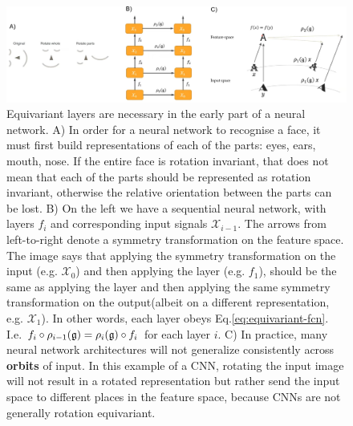 \documentclass[11pt]{article}
\numberwithin{equation}{section}
\begin{document}
\begin{figure}
\begin{center}
\includegraphics[width=\columnwidth]{../figures/invariance-equivariance.png}  
\end{center}
\caption{Equivariant layers are necessary in the early part of a neural network. A) In order for a neural network to recognise a face, it must first build representations of each of the parts: eyes, ears, mouth, nose. If the entire face is rotation invariant, that does not mean that each of the parts should be represented as rotation invariant, otherwise the relative orientation between the parts can be lost. B) On the left we have a sequential neural network, with layers $f_i$ and corresponding input signals $\mathcal{X}_{i-1}$. The arrows from left-to-right denote a symmetry transformation on the feature space. The image says that applying the symmetry transformation on the input (e.g. $\mathcal{X}_0$) and then applying the layer (e.g. $f_1$), should be the same as applying the layer and then applying the same symmetry transformation on the output(albeit on a different representation, e.g. $\mathcal{X}_1$). In other words, each layer obeys Eq.\eqref{eq:equivariant-fcn}. I.e. $f_i \circ \rho_{i-1}(\mathfrak{g}) = \rho_i(\mathfrak{g}) \circ f_i$ for each layer $i$. C) In practice, many neural network architectures will not generalize consistently across \textbf{orbits} of input. In this example of a CNN, rotating the input image will not result in a rotated representation but rather send the input space to different places in the feature space, because CNNs are not generally rotation equivariant.
}
\label{fig:invariance-equivariance}
\end{figure}

\newpage
 
\end{document}
